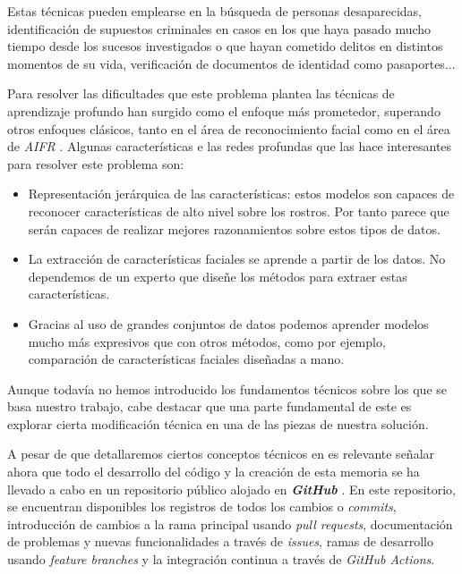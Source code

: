 Estas técnicas pueden emplearse en la búsqueda de personas desaparecidas, identificación de supuestos criminales en casos en los que haya pasado mucho tiempo desde los sucesos investigados o que hayan cometido delitos en distintos momentos de su vida, verificación de documentos de identidad como pasaportes... \cite{informatica:aifr_survey}

Para resolver las dificultades que este problema plantea las técnicas de aprendizaje profundo han surgido como el enfoque más prometedor, superando otros enfoques clásicos, tanto en el área de reconocimiento facial \cite{informatica:deep_fr_survey} como en el área de \textit{AIFR} \cite{informatica:aifr_survey}. Algunas características e las redes profundas que las hace interesantes para resolver este problema son:

\begin{itemize}
	\item Representación jerárquica de las características: estos modelos son capaces de reconocer características de alto nivel sobre los rostros. Por tanto parece que serán capaces de realizar mejores razonamientos sobre estos tipos de datos.
	\item La extracción de características faciales se aprende a partir de los datos. No dependemos de un experto que diseñe los métodos para extraer estas características.
	\item Gracias al uso de grandes conjuntos de datos podemos aprender modelos mucho más expresivos que con otros métodos, como por ejemplo, comparación de características faciales diseñadas a mano.
\end{itemize}

Aunque todavía no hemos introducido los fundamentos técnicos sobre los que se basa nuestro trabajo, cabe destacar que una parte fundamental de este es explorar cierta modificación técnica en una de las piezas de nuestra solución.

A pesar de que detallaremos ciertos conceptos técnicos en  es relevante señalar ahora que todo el desarrollo del código y la creación de esta memoria se ha llevado a cabo en un repositorio público alojado en \textbf{\textit{GitHub}} \cite{informatica:repogithub}. En este repositorio, se encuentran disponibles los registros de todos los cambios o \textit{commits}, introducción de cambios a la rama principal usando \textit{pull requests}, documentación de problemas y nuevas funcionalidades a través de \textit{issues}, ramas de desarrollo usando \textit{feature branches} y la integración continua a través de \textit{GitHub Actions}.

